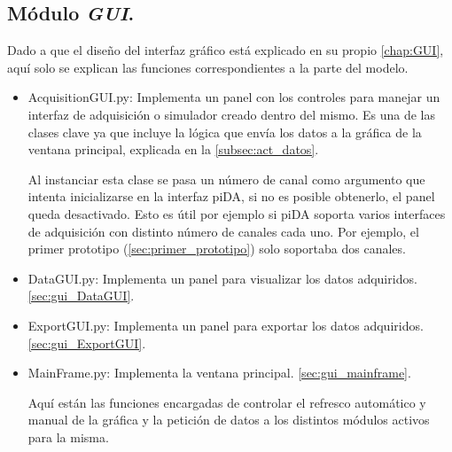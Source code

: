 	\subsection{Módulo \emph{GUI}.}	
		Dado a que el diseño del interfaz gráfico está explicado en su propio \autoref{chap:GUI}, aquí solo se explican las funciones correspondientes a la parte del modelo.
		\begin{itemize}
			\item AcquisitionGUI.py: Implementa un panel con los controles para manejar un interfaz de adquisición o simulador creado dentro del mismo. Es una de las clases clave ya que incluye la lógica que envía los datos a la gráfica de la ventana principal, explicada en la \autoref{subsec:act_datos}.
			
			Al instanciar esta clase se pasa un número de canal como argumento que intenta inicializarse en la interfaz piDA, si no es posible obtenerlo, el panel queda desactivado. Esto es útil por ejemplo si piDA soporta varios interfaces de adquisición con distinto número de canales cada uno. Por ejemplo, el primer prototipo (\autoref{sec:primer_prototipo}) solo soportaba dos canales.
			
			\item DataGUI.py: Implementa un panel para visualizar los datos adquiridos. \autoref{sec:gui_DataGUI}.
			\item ExportGUI.py: Implementa un panel para exportar los datos adquiridos. \autoref{sec:gui_ExportGUI}.
			\item MainFrame.py: Implementa la ventana principal. \autoref{sec:gui_mainframe}.
			
			Aquí están las funciones encargadas de controlar el refresco automático y manual de la gráfica y la petición de datos a los distintos módulos activos para la misma.
		\end{itemize}
	
